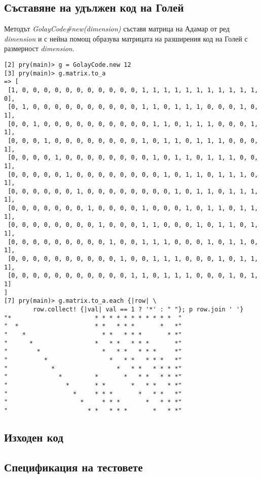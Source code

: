 \documentclass[a4paper,notitlepage,oneside]{report}
\begin{document}
\subsection{Съставяне на удължен код на Голей}
Методът \emph{GolayCode\#new(dimension)} съставя матрица на Адамар от ред
\emph{dimension} и с нейна помощ образува матрицата на разширения код на Голей с
размерност \emph{dimension}.

\begin{lstlisting}
[2] pry(main)> g = GolayCode.new 12
[3] pry(main)> g.matrix.to_a
=> [
 [1, 0, 0, 0, 0, 0, 0, 0, 0, 0, 0, 0, 1, 1, 1, 1, 1, 1, 1, 1, 1, 1, 1, 0],
 [0, 1, 0, 0, 0, 0, 0, 0, 0, 0, 0, 0, 1, 1, 0, 1, 1, 1, 0, 0, 0, 1, 0, 1],
 [0, 0, 1, 0, 0, 0, 0, 0, 0, 0, 0, 0, 0, 1, 1, 0, 1, 1, 1, 0, 0, 0, 1, 1],
 [0, 0, 0, 1, 0, 0, 0, 0, 0, 0, 0, 0, 1, 0, 1, 1, 0, 1, 1, 1, 0, 0, 0, 1],
 [0, 0, 0, 0, 1, 0, 0, 0, 0, 0, 0, 0, 0, 1, 0, 1, 1, 0, 1, 1, 1, 0, 0, 1],
 [0, 0, 0, 0, 0, 1, 0, 0, 0, 0, 0, 0, 0, 0, 1, 0, 1, 1, 0, 1, 1, 1, 0, 1],
 [0, 0, 0, 0, 0, 0, 1, 0, 0, 0, 0, 0, 0, 0, 0, 1, 0, 1, 1, 0, 1, 1, 1, 1],
 [0, 0, 0, 0, 0, 0, 0, 1, 0, 0, 0, 0, 1, 0, 0, 0, 1, 0, 1, 1, 0, 1, 1, 1],
 [0, 0, 0, 0, 0, 0, 0, 0, 1, 0, 0, 0, 1, 1, 0, 0, 0, 1, 0, 1, 1, 0, 1, 1],
 [0, 0, 0, 0, 0, 0, 0, 0, 0, 1, 0, 0, 1, 1, 1, 0, 0, 0, 1, 0, 1, 1, 0, 1],
 [0, 0, 0, 0, 0, 0, 0, 0, 0, 0, 1, 0, 0, 1, 1, 1, 0, 0, 0, 1, 0, 1, 1, 1],
 [0, 0, 0, 0, 0, 0, 0, 0, 0, 0, 0, 1, 1, 0, 1, 1, 1, 0, 0, 0, 1, 0, 1, 1]
]
[7] pry(main)> g.matrix.to_a.each {|row| \
        row.collect! {|val| val == 1 ? '*' : " "}; p row.join ' '}
"*                       * * * * * * * * * * *  "
"  *                     * *   * * *       *   *"
"    *                     * *   * * *       * *"
"      *                 *   * *   * * *       *"
"        *                 *   * *   * * *     *"
"          *                 *   * *   * * *   *"
"            *                 *   * *   * * * *"
"              *         *       *   * *   * * *"
"                *       * *       *   * *   * *"
"                  *     * * *       *   * *   *"
"                    *     * * *       *   * * *"
"                      * *   * * *       *   * *"
\end{lstlisting}


\subsection*{Изходен код}



\subsection*{Спецификация на тестовете}
\end{document}
